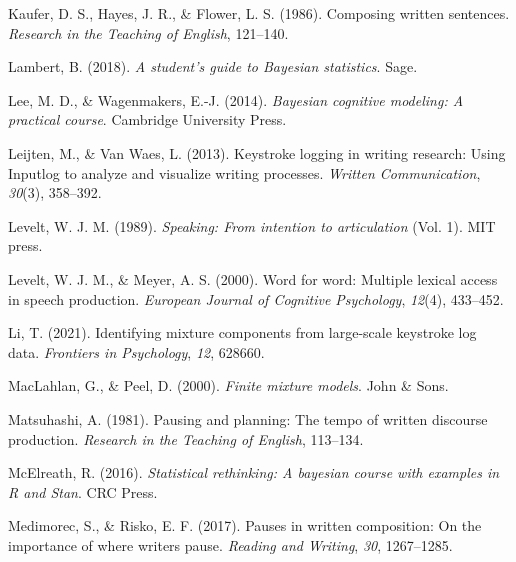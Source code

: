 \documentclass[
  man,floatsintext]{apa7}
\newlength{\cslhangindent}
\newlength{\cslentryspacingunit} %
\newenvironment{CSLReferences}[2] %
 {%
  \setlength{\parindent}{0pt}
  \ifodd #1
  \let\oldpar\par
  \def\par{\hangindent=\cslhangindent\oldpar}
  \fi
  \setlength{\parskip}{#2\cslentryspacingunit}
 }%
 {}
\begin{document}
\begin{CSLReferences}{1}{0}
\leavevmode{}%
Kaufer, D. S., Hayes, J. R., \& Flower, L. S. (1986). Composing written sentences. \emph{Research in the Teaching of English}, 121--140.

\leavevmode{}%
Lambert, B. (2018). \emph{A student's guide to {B}ayesian statistics}. Sage.

\leavevmode{}%
Lee, M. D., \& Wagenmakers, E.-J. (2014). \emph{Bayesian cognitive modeling: A practical course}. Cambridge University Press.

\leavevmode{}%
Leijten, M., \& Van Waes, L. (2013). Keystroke logging in writing research: Using {Inputlog} to analyze and visualize writing processes. \emph{Written Communication}, \emph{30}(3), 358--392.

\leavevmode{}%
Levelt, W. J. M. (1989). \emph{Speaking: {F}rom intention to articulation} (Vol. 1). MIT press.

\leavevmode{}%
Levelt, W. J. M., \& Meyer, A. S. (2000). Word for word: Multiple lexical access in speech production. \emph{European Journal of Cognitive Psychology}, \emph{12}(4), 433--452.

\leavevmode{}%
Li, T. (2021). Identifying mixture components from large-scale keystroke log data. \emph{Frontiers in Psychology}, \emph{12}, 628660.

\leavevmode{}%
MacLahlan, G., \& Peel, D. (2000). \emph{Finite mixture models}. John \& Sons.

\leavevmode{}%
Matsuhashi, A. (1981). Pausing and planning: The tempo of written discourse production. \emph{Research in the Teaching of English}, 113--134.

\leavevmode{}%
McElreath, R. (2016). \emph{Statistical rethinking: {A} bayesian course with examples in {R} and {Stan}}. CRC Press.

\leavevmode{}%
Medimorec, S., \& Risko, E. F. (2017). Pauses in written composition: On the importance of where writers pause. \emph{Reading and Writing}, \emph{30}, 1267--1285.


\end{CSLReferences}
\end{document}

